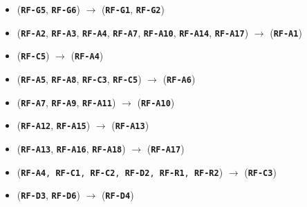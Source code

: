 \documentclass[a4paper,12pt]{ThesisStyle}
\begin{document}
\begin{itemize}
  \item (\texttt{\textbf{RF-G5}}, \texttt{\textbf{RF-G6}}) \hspace{1pt} $\longrightarrow$ \hspace{1pt} (\texttt{\textbf{RF-G1}}, \texttt{\textbf{RF-G2}})
  \item (\texttt{\textbf{RF-A2}}, \texttt{\textbf{RF-A3}}, \texttt{\textbf{RF-A4}}, \texttt{\textbf{RF-A7}}, \texttt{\textbf{RF-A10}}, \texttt{\textbf{RF-A14}}, \texttt{\textbf{RF-A17}}) \hspace{1pt} $\longrightarrow$ \hspace{1pt} (\texttt{\textbf{RF-A1}})
  \item (\texttt{\textbf{RF-C5}}) \hspace{1pt} $\longrightarrow$ \hspace{1pt} (\texttt{\textbf{RF-A4}})
  \item (\texttt{\textbf{RF-A5}}, \texttt{\textbf{RF-A8}}, \texttt{\textbf{RF-C3}}, \texttt{\textbf{RF-C5}}) \hspace{1pt} $\longrightarrow$ \hspace{1pt} (\texttt{\textbf{RF-A6}})
  \item (\texttt{\textbf{RF-A7}}, \texttt{\textbf{RF-A9}}, \texttt{\textbf{RF-A11}}) \hspace{1pt} $\longrightarrow$ \hspace{1pt} (\texttt{\textbf{RF-A10}})
  \item (\texttt{\textbf{RF-A12}}, \texttt{\textbf{RF-A15}}) \hspace{1pt} $\longrightarrow$ \hspace{1pt} (\texttt{\textbf{RF-A13}})
  \item (\texttt{\textbf{RF-A13}}, \texttt{\textbf{RF-A16}}, \texttt{\textbf{RF-A18}}) \hspace{1pt} $\longrightarrow$ \hspace{1pt} (\texttt{\textbf{RF-A17}})
  \item (\texttt{\textbf{RF-A4}, \texttt{\textbf{RF-C1}}, \texttt{\textbf{RF-C2}}, \texttt{\textbf{RF-D2}}, \texttt{\textbf{RF-R1}}, \texttt{\textbf{RF-R2}}}) \hspace{1pt} $\longrightarrow$ \hspace{1pt} (\texttt{\textbf{RF-C3}})
  \item (\texttt{\textbf{RF-D3}}, \texttt{\textbf{RF-D6}}) \hspace{1pt} $\longrightarrow$ \hspace{1pt} (\texttt{\textbf{RF-D4}})

\end{itemize}
\end{document}

